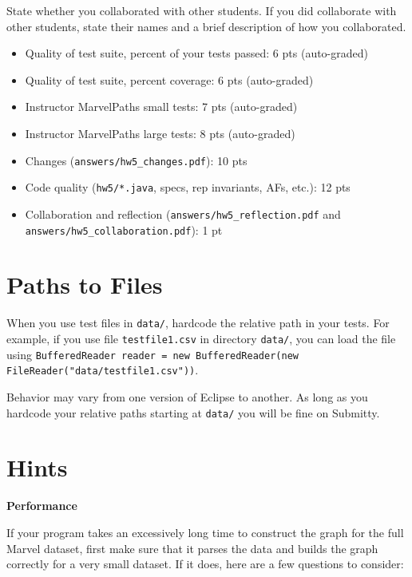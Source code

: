 \documentclass[11pt]{article}
\begin{document}
\noindent State whether you collaborated with other students. If you did collaborate with other students, state their names and a brief description of how you collaborated.

\newpage

\begin{itemize}
\item Quality of test suite, percent of your tests passed: 6 pts (auto-graded)
\item Quality of test suite, percent coverage: 6 pts (auto-graded)
\item Instructor MarvelPaths small tests: 7 pts (auto-graded)
\item Instructor MarvelPaths large tests: 8 pts (auto-graded)
\item Changes (\texttt{answers/hw5\_changes.pdf}): 10 pts
\item Code quality (\texttt{hw5/*.java}, specs, rep invariants, AFs, etc.): 12 pts
\item Collaboration and reflection (\texttt{answers/hw5\_reflection.pdf} and \texttt{answers/hw5\_collaboration.pdf}): 1 pt
\end{itemize}

\section*{Paths to Files}
\label{sec:Paths}

When you use test files in \texttt{data/}, hardcode the relative path in your tests. For example, if you use file \texttt{testfile1.csv} in directory \texttt{data/}, you can load the file using \texttt{BufferedReader reader = new BufferedReader(new FileReader("data/testfile1.csv"))}.

\noindent Behavior may vary from one version of Eclipse to another. As long as you hardcode your relative paths starting at \texttt{data/} you will be fine on Submitty.

\section*{Hints}
\label{sec:Hints}
\large{\textbf{Performance}}

\noindent If your program takes an excessively long time to construct the graph for the full Marvel dataset, first make sure that it parses the data and builds the graph correctly for a very small dataset. If it does, here are a few questions to consider:
\end{document}
